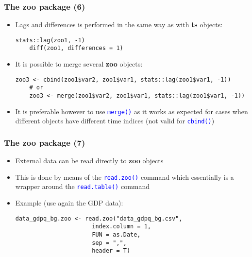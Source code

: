 \documentclass[10pt]{beamer}
\newcommand{\cc}[1]{\texttt{\textcolor{blue}{#1}}}
\theoremstyle{definition}
\begin{document}
\begin{frame}[fragile]
\frametitle{The \textbf{zoo} package (6)}
\begin{itemize}
	\item Lags and differences is performed in the same way as with \textbf{ts} objects:
	\begin{lstlisting}[style = rstyle, breaklines]
	stats::lag(zoo1, -1)
	diff(zoo1, differences = 1)
	\end{lstlisting}
	\item It is possible to merge several \textbf{zoo} objects:
	\begin{lstlisting}[style = rstyle, breaklines]
	zoo3 <- cbind(zoo1$var2, zoo1$var1, stats::lag(zoo1$var1, -1)) 
	# or
	zoo3 <- merge(zoo1$var2, zoo1$var1, stats::lag(zoo1$var1, -1))
	\end{lstlisting}
	\item It is preferable however to use \cc{merge()} as it works as expected for cases when different objects have different time indices (not valid for \cc{cbind()})
\end{itemize}
\end{frame}

\begin{frame}[fragile]
\frametitle{The \textbf{zoo} package (7)}
\begin{itemize}
	\item External data can be read directly to \textbf{zoo} objects
	\item This is done by means of the \cc{read.zoo()} command which essentially is a wrapper around the \cc{read.table()} command
	\item Example (use again the GDP data):
	\begin{lstlisting}[style = rstyle, breaklines]
	data_gdpq_bg.zoo <- read.zoo("data_gdpq_bg.csv", 
                      index.column = 1, 
                      FUN = as.Date,
                      sep = ",",
                      header = T)
	\end{lstlisting}
\end{itemize}
\end{frame}
\end{document}
